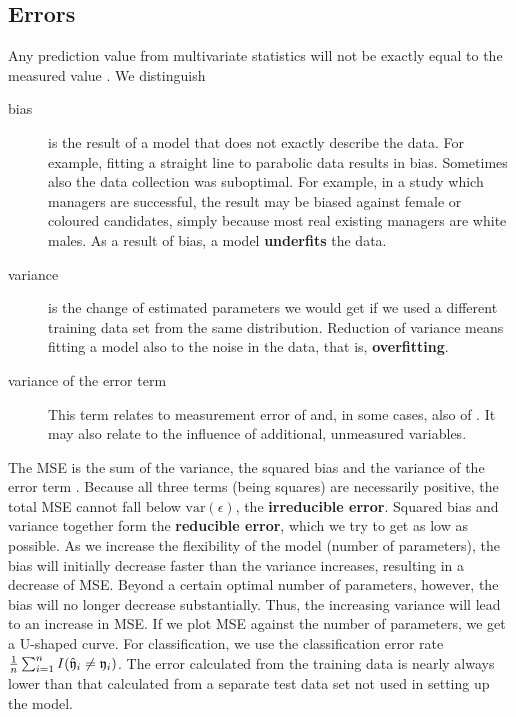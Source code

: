 \begin{refsection}
\subsection{Errors}

Any prediction value  from multivariate statistics will not be exactly equal to the measured value . We distinguish
\begin{description}
  \item[bias]{is the result of a model that does not exactly describe the data. For example, fitting a straight line to parabolic data results in bias. Sometimes also the data collection was suboptimal. For example, in a study which managers are successful, the result may be biased against female or coloured candidates, simply because most real existing managers are white males. As a result of bias, a model \textbf{underfits} the data. }
  \item[variance]{is the change of estimated parameters we would get if we used a different training data set from the same distribution. Reduction of variance means fitting a model also to the noise in the data, that is, \textbf{overfitting}. }
  \item[variance of the error term \skalar{\epsilon}]{This term relates to measurement error of  and, in some cases, also of . It may also relate to the influence of additional, unmeasured variables.}
\end{description}
The \acf{MSE} is the sum of the variance, the squared bias and the variance of the error term \skalar{\epsilon}. Because all three terms (being squares) are necessarily positive, the total \acs{MSE} cannot fall below \( \mathrm{var}(\epsilon) \), the \textbf{irreducible error}. Squared bias and variance together form the \textbf{reducible error}, which we try to get as low as possible. As we increase the flexibility of the model (number of parameters), the bias will initially decrease faster than the variance increases, resulting in a decrease of \acs{MSE}. Beyond a certain optimal number of parameters, however, the bias will no longer decrease substantially. Thus, the increasing variance will lead to an increase in \acs{MSE}. If we plot \acs{MSE} against the number of parameters, we get a U-shaped curve. For classification, we use the classification error rate \( \frac{1}{n}\sum_{i=1}^n{I(\hat{\mathfrak{y}}_i \neq \mathfrak{y}_i)} \). The error calculated from the training data is nearly always lower than that calculated from a separate test data set not used in setting up the model.


\end{refsection}
